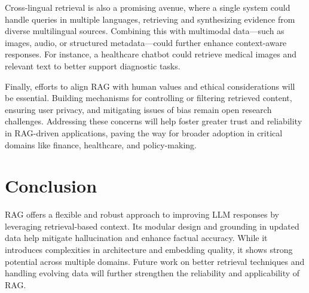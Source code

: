 \documentclass[conference]{IEEEtran}
\begin{document}
Cross-lingual retrieval is also a promising avenue, where a single system could handle queries in multiple languages, retrieving and synthesizing evidence from diverse multilingual sources. Combining this with multimodal data—such as images, audio, or structured metadata—could further enhance context-aware responses. For instance, a healthcare chatbot could retrieve medical images and relevant text to better support diagnostic tasks.

Finally, efforts to align RAG with human values and ethical considerations will be essential. Building mechanisms for controlling or filtering retrieved content, ensuring user privacy, and mitigating issues of bias remain open research challenges. Addressing these concerns will help foster greater trust and reliability in RAG-driven applications, paving the way for broader adoption in critical domains like finance, healthcare, and policy-making.

\section{Conclusion}
RAG offers a flexible and robust approach to improving LLM responses by leveraging retrieval-based context.
Its modular design and grounding in updated data help mitigate hallucination and enhance factual accuracy.
While it introduces complexities in architecture and embedding quality, it shows strong potential across multiple domains.
Future work on better retrieval techniques and handling evolving data will further strengthen the reliability and applicability of RAG.




\end{document}
